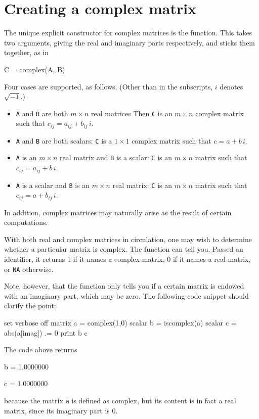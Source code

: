 \section{Creating a complex matrix}
\label{sec:cmplx-create}

The unique explicit constructor for complex matrices is the
 function. This takes two arguments, giving the real
and imaginary parts respectively, and sticks them together, as in
\begin{code}
C = complex(A, B)
\end{code}
Four cases are supported, as follows. (Other than in the subscripts,
$i$ denotes $\sqrt{-1}$.)
\begin{itemize}
\item \texttt{A} and \texttt{B} are both $m \times n$ real matrices
  Then \texttt{C} is an $m \times n$ complex matrix such that
  $c_{ij} = a_{ij} + b_{ij}\,i$.
\item \texttt{A} and \texttt{B} are both scalars: \texttt{C} is a
  $1 \times 1$ complex matrix such that $c = a + b\,i$.
\item \texttt{A} is an $m \times n$ real matrix and \texttt{B} is a
  scalar: \texttt{C} is an $m \times n$ matrix such that
  $c_{ij} = a_{ij} + b\,i$.
\item \texttt{A} is a scalar and \texttt{B} is an $m \times n$ real
  matrix: \texttt{C} is an $m \times n$ matrix such that
  $c_{ij} = a + b_{ij}\,i$.
\end{itemize}

In addition, complex matrices may naturally arise as the result of
certain computations.

With both real and complex matrices in circulation, one may wish to
determine whether a particular matrix is complex. The function
 can tell you. Passed an identifier, it returns 1
if it names a complex matrix, 0 if it names a real matrix, or
\texttt{NA} otherwise.

Note, however, that the  function only tells you if a
certain matrix is endowed with an imaginary part, which may be
zero. The following code snippet should clarify the point:
\begin{code}
set verbose off
matrix a = complex(1,0)
scalar b = iscomplex(a)
scalar c = abs(a[imag]) .= 0
print b c
\end{code}

The code above returns
\begin{code}
              b =  1.0000000

              c =  1.0000000
\end{code}
because the matrix \texttt{a} is defined as complex, but its content
is in fact a real matrix, since its imaginary part is 0.

